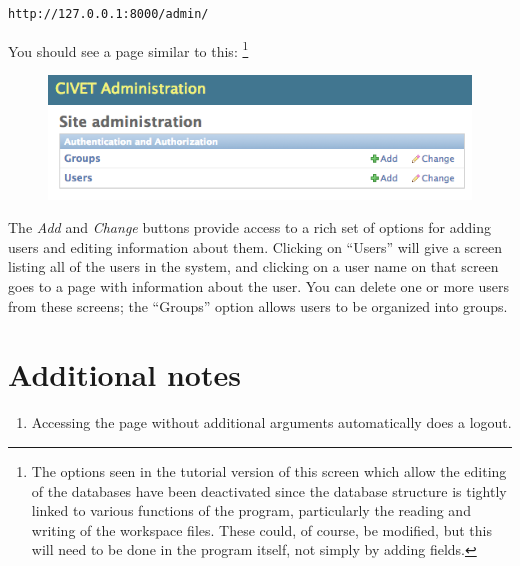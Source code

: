 \documentclass[letterpaper,10pt,english]{sphinxmanual}
\begin{document}
\begin{Verbatim}[commandchars=\\\{\}]
http://127.0.0.1:8000/admin/
\end{Verbatim}

You should see a page similar to this: \footnote{
The options seen in the tutorial version of this screen which allow the editing of the databases have been deactivated
since the database structure is tightly linked to various functions of the program, particularly the reading and
writing of the workspace files. These could, of course, be modified, but this will need to be done in the program
itself, not simply by adding fields.
}
\begin{figure}[htbp]
\centering

\includegraphics{adminpage.png}
\end{figure}

The \emph{Add} and \emph{Change} buttons provide access to a rich set of options for adding users and editing information about them.
Clicking on “Users” will give a screen listing all of the users in the system, and clicking on a user name on that screen
goes to a page with information about the user. You can delete one or more users from these screens; the “Groups” option
allows users to be organized into groups.


\section{Additional notes}
\label{authentication:additional-notes}\begin{enumerate}
\item {} 
Accessing the page without additional arguments automatically does a logout.

\end{enumerate}
\end{document}
